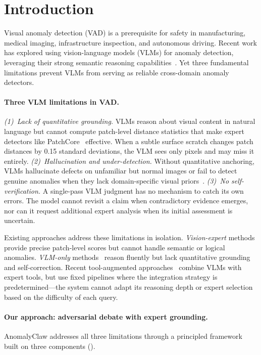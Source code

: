 \section{Introduction}

Visual anomaly detection (VAD) is a prerequisite for safety in manufacturing, medical imaging, infrastructure inspection, and autonomous driving.
Recent work has explored using vision-language models (VLMs) for anomaly detection, leveraging their strong semantic reasoning capabilities~\citep{gu2024anomalygpt,jiang2024mmad,chen2026eagle}.
Yet three fundamental limitations prevent VLMs from serving as reliable cross-domain anomaly detectors.

\paragraph{Three VLM limitations in VAD.}
\emph{(1)~Lack of quantitative grounding.}
VLMs reason about visual content in natural language but cannot compute patch-level distance statistics that make expert detectors like PatchCore~\citep{roth2022patchcore} effective.
When a subtle surface scratch changes patch distances by 0.15 standard deviations, the VLM sees only pixels and may miss it entirely.
\emph{(2)~Hallucination and under-detection.}
Without quantitative anchoring, VLMs hallucinate defects on unfamiliar but normal images or fail to detect genuine anomalies when they lack domain-specific visual priors~\citep{jiang2024mmad}.
\emph{(3)~No self-verification.}
A single-pass VLM judgment has no mechanism to catch its own errors.
The model cannot revisit a claim when contradictory evidence emerges, nor can it request additional expert analysis when its initial assessment is uncertain.

Existing approaches address these limitations in isolation.
\emph{Vision-expert} methods~\citep{roth2022patchcore,oquab2024dinov2,jeong2023winclip} provide precise patch-level scores but cannot handle semantic or logical anomalies.
\emph{VLM-only} methods~\citep{gu2024anomalygpt,jiang2024mmad,cao2025anomalyonevision} reason fluently but lack quantitative grounding and self-correction.
Recent tool-augmented approaches~\citep{zhang2025agentiad,chen2026eagle,wei2025autoiad} combine VLMs with expert tools, but use fixed pipelines where the integration strategy is predetermined---the system cannot adapt its reasoning depth or expert selection based on the difficulty of each query.

\paragraph{Our approach: adversarial debate with expert grounding.}
AnomalyClaw addresses all three limitations through a principled framework built on three components ().

